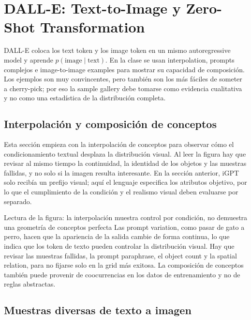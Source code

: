 \section{DALL-E: Text-to-Image y Zero-Shot Transformation}

DALL-E coloca los text token y los image token en un mismo autoregressive model y aprende $p(\text{image}\mid\text{text})$. En la clase se usan interpolation, prompts complejos e image-to-image examples para mostrar su capacidad de composición. Los ejemplos son muy convincentes, pero también son los más fáciles de someter a cherry-pick; por eso la sample gallery debe tomarse como evidencia cualitativa y no como una estadística de la distribución completa.

\subsection{Interpolación y composición de conceptos}

Esta sección empieza con la interpolación de conceptos para observar cómo el condicionamiento textual desplaza la distribución visual. Al leer la figura hay que revisar al mismo tiempo la continuidad, la identidad de los objetos y las muestras fallidas, y no solo si la imagen resulta interesante. En la sección anterior, iGPT solo recibía un prefijo visual; aquí el lenguaje especifica los atributos objetivo, por lo que el cumplimiento de la condición y el realismo visual deben evaluarse por separado.


\begin{knowledgebox}{Lectura de la figura: la interpolación muestra control por condición, no demuestra una geometría de conceptos perfecta}
Las prompt variation, como pasar de gato a perro, hacen que la apariencia de la salida cambie de forma continua, lo que indica que los token de texto pueden controlar la distribución visual. Hay que revisar las muestras fallidas, la prompt paraphrase, el object count y la spatial relation, para no fijarse solo en la grid más exitosa. La composición de conceptos también puede provenir de coocurrencias en los datos de entrenamiento y no de reglas abstractas.
\end{knowledgebox}

\subsection{Muestras diversas de texto a imagen}

